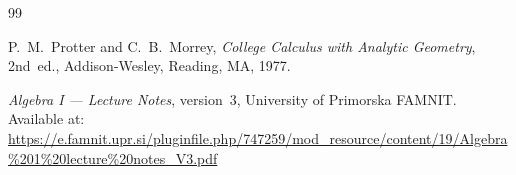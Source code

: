 \documentclass[11pt]{article}
\theoremstyle{plain}
\theoremstyle{definition}
\begin{document}
\newpage

\begin{thebibliography}{99}
\sloppy

P.~M.~Protter and C.~B.~Morrey,
\textit{College Calculus with Analytic Geometry},
2nd~ed., Addison-Wesley, Reading, MA, 1977.

\textit{Algebra I --- Lecture Notes}, version~3,
University of Primorska FAMNIT\@.
Available at:\\
\url{https://e.famnit.upr.si/pluginfile.php/747259/mod_resource/content/19/Algebra%201%20lecture%20notes_V3.pdf}

\end{thebibliography}
\end{document}
